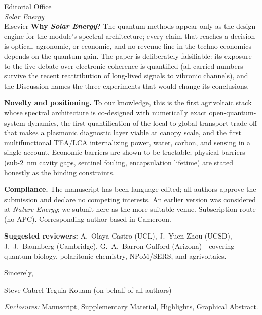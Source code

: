 \documentclass[10pt]{letter}
\begin{document}
\begin{letter}{Editorial Office\\
\textit{Solar Energy}\\
Elsevier}
\noindent\textbf{Why \textit{Solar Energy}?}
The quantum methods appear only as the design engine for the module's spectral architecture; every claim that reaches a decision is optical, agronomic, or economic, and no revenue line in the techno-economics depends on the quantum gain. The paper is deliberately falsifiable: its exposure to the live debate over electronic coherence is quantified (all carried numbers survive the recent reattribution of long-lived signals to vibronic channels), and the Discussion names the three experiments that would change its conclusions.

\noindent\textbf{Novelty and positioning.}
To our knowledge, this is the first agrivoltaic stack whose spectral architecture is co-designed with numerically exact open-quantum-system dynamics, the first quantification of the local-to-global transport trade-off that makes a plasmonic diagnostic layer viable at canopy scale, and the first multifunctional TEA/LCA internalizing power, water, carbon, and sensing in a single account. Economic barriers are shown to be tractable; physical barriers (sub-\qty{2}{\nano\meter} cavity gaps, sentinel fouling, encapsulation lifetime) are stated honestly as the binding constraints.

\noindent\textbf{Compliance.}
The manuscript has been language-edited; all authors approve the submission and declare no competing interests. An earlier version was considered at \textit{Nature Energy}; we submit here as the more suitable venue. Subscription route (no APC). Corresponding author based in Cameroon.

\noindent\textbf{Suggested reviewers:} A.~Olaya-Castro (UCL), J.~Yuen-Zhou (UCSD), J.~J.~Baumberg (Cambridge), G.~A.~Barron-Gafford (Arizona)---covering quantum biology, polaritonic chemistry, NPoM/SERS, and agrivoltaics.

\medskip
\vspace{-0.5em}
Sincerely,

Steve Cabrel Teguia Kouam (on behalf of all authors)

\vspace{-1.4em}
\textit{Enclosures:} Manuscript, Supplementary Material, Highlights, Graphical Abstract.

\end{letter}
\end{document}
